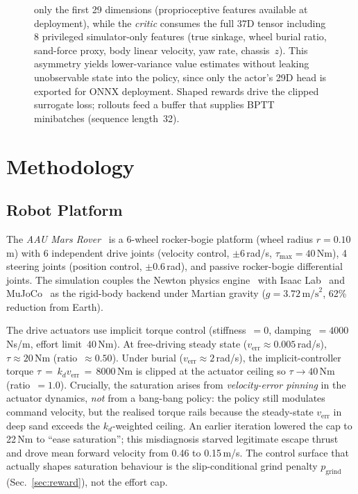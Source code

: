 \documentclass[conference]{IEEEtran}
\begin{document}
\begin{figure}[!htbp]
{    only the first 29 dimensions (proprioceptive features available at
    deployment), while the \emph{critic} consumes the full 37D tensor including
    8 privileged simulator-only features (true sinkage, wheel burial ratio,
    sand-force proxy, body linear velocity, yaw rate, chassis~$z$). This
    asymmetry yields lower-variance value estimates without leaking
    unobservable state into the policy, since only the actor's 29D head is
    exported for ONNX deployment. Shaped rewards drive the clipped surrogate
    loss; rollouts feed a buffer that supplies BPTT minibatches (sequence
    length~32).}
  \label{fig:training_loop}
\end{figure}

\section{Methodology}
\label{sec:method}

\subsection{Robot Platform}

The \textit{AAU Mars Rover}~\cite{rlroverlab} is a 6-wheel rocker-bogie platform
(wheel radius $r{=}0.10$\,m) with 6 independent drive joints (velocity control,
$\pm6$\,rad/s, $\tau_{\max}{=}40$\,Nm), 4 steering joints (position control,
$\pm0.6$\,rad), and passive rocker-bogie differential joints. The simulation
couples the Newton physics engine~\cite{newton} with Isaac Lab~\cite{isaaclab}
and MuJoCo~\cite{todorov2012mujoco} as the rigid-body backend under Martian
gravity ($g{=}3.72\,\text{m/s}^2$, 62\% reduction from Earth).

The drive actuators use implicit torque control (stiffness~$=0$,
damping~$=4000$\,Ns/m, effort limit~$40$\,Nm). At free-driving steady state
($v_\text{err}{\approx}0.005$\,rad/s), $\tau{\approx}20$\,Nm (ratio~$\approx0.50$).
Under burial ($v_\text{err}{\approx}2$\,rad/s), the implicit-controller torque
$\tau \,{=}\, k_d v_\text{err} \,{=}\, 8000$\,Nm is clipped at the actuator
ceiling so $\tau\to40$\,Nm (ratio~$=1.0$). Crucially, the saturation arises
from \emph{velocity-error pinning} in the actuator dynamics, \emph{not} from a
bang-bang policy: the policy still modulates command velocity, but the realised
torque rails because the steady-state $v_\text{err}$ in deep sand exceeds the
$k_d$-weighted ceiling. An earlier iteration lowered the cap to 22\,Nm to
``ease saturation''; this misdiagnosis starved legitimate escape thrust and
drove mean forward velocity from 0.46 to 0.15\,m/s. The control surface that
actually shapes saturation behaviour is the slip-conditional grind penalty
$p_\text{grind}$ (Sec.~\ref{sec:reward}), not the effort cap.
\end{document}
